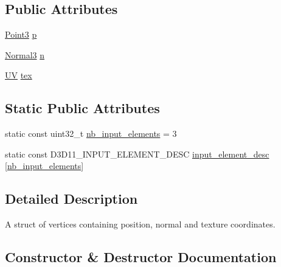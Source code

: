 \subsection*{Public Attributes}
\begin{DoxyCompactItemize}
\item 
\hyperlink{structmage_1_1_point3}{Point3} \hyperlink{structmage_1_1_vertex_position_normal_texture_a9000b80274027dd7b7d258f45523ca65}{p}
\item 
\hyperlink{structmage_1_1_normal3}{Normal3} \hyperlink{structmage_1_1_vertex_position_normal_texture_a442eb1609ab596e3e33c26f7be32695a}{n}
\item 
\hyperlink{structmage_1_1_u_v}{UV} \hyperlink{structmage_1_1_vertex_position_normal_texture_a0782e41c5e28d421bfb47afad9af9c55}{tex}
\end{DoxyCompactItemize}
\subsection*{Static Public Attributes}
\begin{DoxyCompactItemize}
\item 
static const uint32\+\_\+t \hyperlink{structmage_1_1_vertex_position_normal_texture_ae4e7cf708af3f123450ec65a68e21584}{nb\+\_\+input\+\_\+elements} = 3
\item 
static const D3\+D11\+\_\+\+I\+N\+P\+U\+T\+\_\+\+E\+L\+E\+M\+E\+N\+T\+\_\+\+D\+E\+SC \hyperlink{structmage_1_1_vertex_position_normal_texture_a4e6f650ee5968c6dc873e8e41dae5395}{input\+\_\+element\+\_\+desc} \mbox{[}\hyperlink{structmage_1_1_vertex_position_normal_texture_ae4e7cf708af3f123450ec65a68e21584}{nb\+\_\+input\+\_\+elements}\mbox{]}
\end{DoxyCompactItemize}


\subsection{Detailed Description}
A struct of vertices containing position, normal and texture coordinates. 

\subsection{Constructor \& Destructor Documentation}
\hypertarget{structmage_1_1_vertex_position_normal_texture_a05158b4e9daf54137a2b8fba80890034}{}\label{structmage_1_1_vertex_position_normal_texture_a05158b4e9daf54137a2b8fba80890034} 
